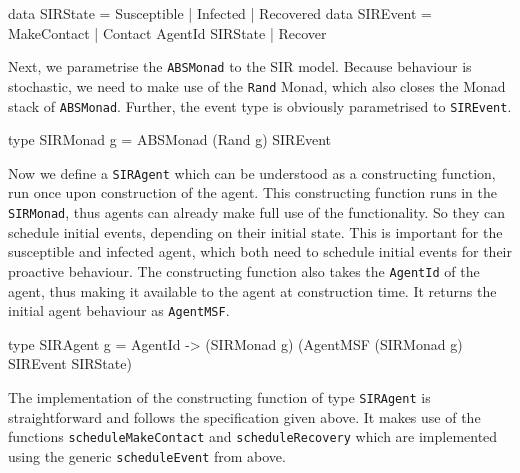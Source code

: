 \begin{HaskellCode}
data SIRState = Susceptible | Infected | Recovered
data SIREvent = MakeContact | Contact AgentId SIRState | Recover 
\end{HaskellCode}

Next, we parametrise the \texttt{ABSMonad} to the SIR model. Because behaviour is stochastic, we need to make use of the \texttt{Rand} Monad, which also closes the Monad stack of \texttt{ABSMonad}. Further, the event type is obviously parametrised to \texttt{SIREvent}.

\begin{HaskellCode}
type SIRMonad g = ABSMonad (Rand g) SIREvent
\end{HaskellCode}

Now we define a \texttt{SIRAgent} which can be understood as a constructing function, run once upon construction of the agent. This constructing function runs in the \texttt{SIRMonad}, thus agents can already make full use of the functionality. So they can schedule initial events, depending on their initial state. This is important for the susceptible and infected agent, which both need to schedule initial events for their proactive behaviour. The constructing function also takes the \texttt{AgentId} of the agent, thus making it available to the agent at construction time. It returns the initial agent behaviour as \texttt{AgentMSF}.

\begin{HaskellCode}
type SIRAgent g 
       = AgentId -> (SIRMonad g) (AgentMSF (SIRMonad g) SIREvent SIRState)
\end{HaskellCode}

The implementation of the constructing function of type \texttt{SIRAgent} is straightforward and follows the specification given above. It makes use of the functions \texttt{scheduleMakeContact} and \texttt{scheduleRecovery} which are implemented using the generic \texttt{scheduleEvent} from above.

